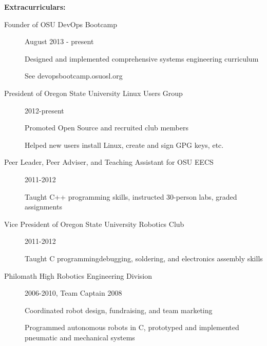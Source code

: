 \documentclass[11pt]{article}
\begin{document}
{\Large \bf Extracurriculars:}
\begin{description}
    \item[Founder of OSU DevOps Bootcamp]
        \hfill August 2013 - present
        
        Designed and implemented comprehensive systems engineering curriculum

        See devopsbootcamp.osuosl.org

    \item[President of Oregon State University Linux Users Group]
        \hfill 2012-present

        Promoted Open Source and recruited club members

        Helped new users install Linux, create and sign GPG keys, etc.

    \item[Peer Leader, Peer Adviser, and Teaching Assistant for OSU EECS]
        \hfill 2011-2012

        Taught C++ programming skills, instructed 30-person labs, graded
        assignments

    \item[Vice President of Oregon State University Robotics Club]
        \hfill 2011-2012

        Taught C programming\/debugging, soldering, and electronics assembly skills

    \item[Philomath High Robotics Engineering Division]
        \hfill 2006-2010, Team Captain 2008

        Coordinated robot design, fundraising, and team marketing

        Programmed autonomous robots in C, prototyped and implemented
        pneumatic and mechanical systems

\end{description}
\end{document}
